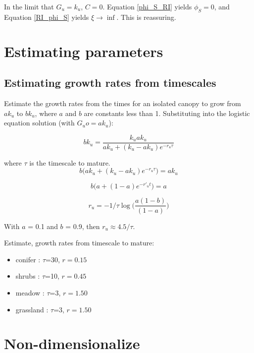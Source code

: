 \documentclass{article}
\begin{document}
In the limit that  $G_u = k_u$, $C=0$.
 Equation \ref{phi_S_RI} yields $\phi_S = 0$,  and Equation \ref{RI_phi_S} yields $\xi \rightarrow \inf$.
 This is reassuring.



\section{Estimating parameters}
\subsection{Estimating growth rates from timescales}

Estimate the growth rates from the times for an isolated canopy to grow from $a k_u$ to $b k_u$, where $a$ and $b$ are constants less than 1.
Substituting into the logistic equation solution (with $ G_uo = a k_u$):

\begin{equation}
    b k_u = \frac{k_u  a k_u }{ a k_u +(k_u- a k_u) e^{-r_u \tau}}
\end{equation}

where $\tau$ is the timescale to mature.
\begin{equation}
    b ({ a k_u +(k_u- a k_u) e^{-r_u \tau}) ={ a k_u }}
\end{equation}

\begin{equation}
    b ({ a  +(1- a ) e^{-r'_u t}) ={ a  }}
\end{equation}

\begin{equation}
r_u =   - 1/ \tau \log \big(\frac{a (1-b) }{(1- a )}\big)
\end{equation}


With $a$ = 0.1 and $b$ = 0.9, then $r_u \approx 4.5/ \tau$.

Estimate, growth rates from timescale to mature:

\begin{itemize}
\item conifer : $\tau$=30, $r=0.15$
\item shrubs : $\tau$=10, $r=0.45$
\item meadow : $\tau$=3, $r=1.50$
\item grassland : $\tau$=3, $r=1.50$
\end{itemize}


\section{Non-dimensionalize}
\end{document}

